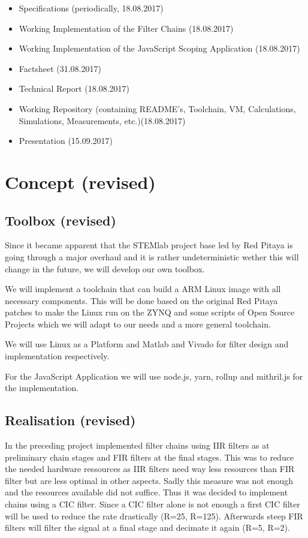 \documentclass[a4paper,oneside]{alpenspecs/alpenspecs}
\begin{document}
\begin{itemize}
    \item Specifications (periodically, 18.08.2017)
    \item Working Implementation of the Filter Chains (18.08.2017)
    \item Working Implementation of the JavaScript Scoping Application (18.08.2017)
    \item Factsheet (31.08.2017)
    \item Technical Report (18.08.2017)
    \item Working Repository (containing README's, Toolchain, VM, Calculations, Simulations, Measurements, etc.)(18.08.2017)
    \item Presentation (15.09.2017)
\end{itemize}

\chapter{Concept (revised)} %
\label{ch:concept}

\section{Toolbox (revised)}

Since it became apparent that the STEMlab project base led by Red Pitaya is going through a major overhaul and it is rather undeterministic wether this will change in the future, we will develop our own toolbox.

We will implement a toolchain that can build a ARM Linux image with all necessary components. This will be done based on the original Red Pitaya patches to make the Linux run on the ZYNQ and some scripts of Open Source Projects which we will adapt to our needs and a more general toolchain.

We will use Linux as a Platform and Matlab and Vivado for filter design and implementation respectively.

For the JavaScript Application we will use node.js, yarn, rollup and mithril.js for the implementation.

\section{Realisation (revised)}

In the preceding project implemented filter chains using IIR filters as at preliminary chain stages and FIR filters at the final stages. This was to reduce the needed hardware ressources as IIR filters need way less resources than FIR filter but are less optimal in other aspects.
Sadly this measure was not enough and the resources available did not suffice.
Thus it was decided to implement chains using a CIC filter.
Since a CIC filter alone is not enough a first CIC filter will be used to reduce the rate drastically (R=25, R=125). Afterwards steep FIR filters will filter the signal at a final stage and decimate it again (R=5, R=2).
\end{document}
